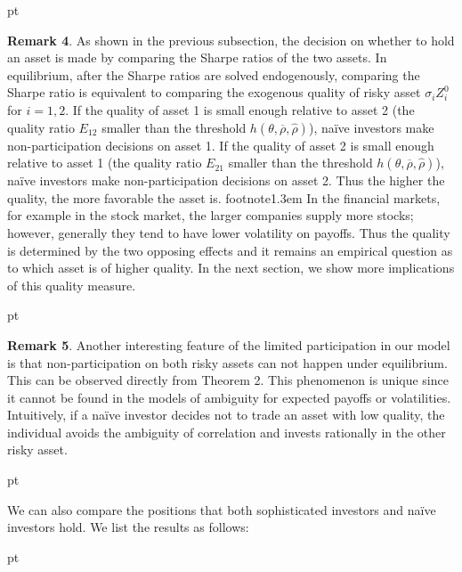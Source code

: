 \documentclass[10pt]{article}
\begin{document}
 pt

{\bf Remark 4}. As shown in the previous subsection, the decision on whether to hold an asset is made by comparing the Sharpe ratios of the two assets. In equilibrium, after the Sharpe ratios are solved endogenously, comparing the Sharpe ratio is equivalent to comparing the exogenous quality of risky asset $ \sigma_i Z_i^0 $ for $ i = 1, 2 $. If the quality of asset 1 is small enough relative to asset 2 (the quality ratio $ E_{12} $ smaller than the threshold $ h (\theta, \overline{\rho}, {\hat \rho}) $), na\"ive investors make non-participation decisions on asset 1. If the quality of asset 2 is small enough relative to asset 1 (the quality ratio $ E_{21} $ smaller than the threshold $ h (\theta, \overline{\rho}, {\hat \rho}) $), na\"ive investors make non-participation decisions on asset 2. Thus the higher the quality, the more favorable the asset is. footnote{\baselineskip1.3em In the financial markets, for example in the stock market, the larger companies supply more stocks; however, generally they tend to have lower volatility on payoffs. Thus the quality is determined by the two opposing effects and it remains an empirical question as to which asset is of higher quality.} In the next section, we show more implications of this quality measure. 

 pt

{\bf Remark 5}. Another interesting feature of the limited participation in our model is that non-participation on both risky assets can not happen under equilibrium. This can be observed directly from Theorem 2. This phenomenon is unique since it cannot be found in the models of ambiguity for expected payoffs or volatilities. Intuitively, if a na\"ive investor decides not to trade an asset with low quality, the individual avoids the ambiguity of correlation and invests rationally in the other risky asset.

 pt

We can also compare the positions that both sophisticated investors and na\"ive investors hold. We list the results as follows:

 pt
\end{document}
